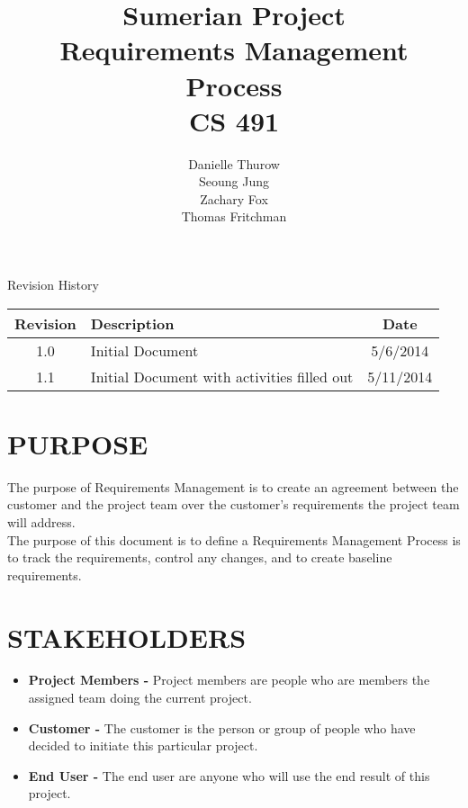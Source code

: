 \documentclass[11pt]{article}
\title{Sumerian Project\\
		Requirements Management Process\\
		CS 491}
\author{Danielle Thurow \\
		  Seoung Jung\\
		  Zachary Fox\\
		  Thomas Fritchman}
\date{}
\begin{document}
\maketitle

\newpage

\tableofcontents

\newpage

\begin{center}

\Large Revision History\\
\begin{tabularx}{\textwidth}{|c|X|c|}
	\hline
	\textbf{Revision} & \textbf{Description} & \textbf{Date}\\ \hline
	1.0 & Initial Document & 5/6/2014\\ \hline
	1.1 & Initial Document with activities filled out & 5/11/2014\\ \hline
\end{tabularx}


\end{center}

\newpage



\section{PURPOSE} 
The purpose of Requirements Management is to create an agreement between the customer and the project team over the customer's requirements the project team will address.\\
 
The purpose of this document is to define a Requirements Management Process is to track the requirements, control any changes, and to create baseline requirements.\\

\section{STAKEHOLDERS}  

\begin{itemize}

\item \textbf{Project Members -} Project members are people who are members the assigned team doing the current project. \\

\item \textbf{Customer -} The customer is the person or group of people who have decided to initiate this particular project.\\

\item \textbf{End User -} The end user are anyone who will use the end result of this project.\\

\end{itemize}
\end{document}
